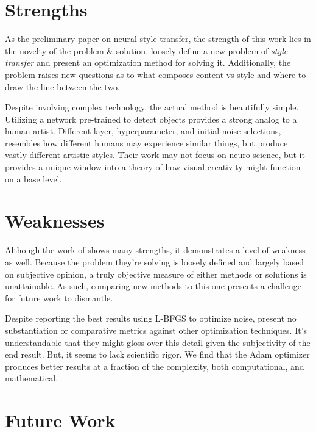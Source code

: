 \documentclass{article}
\begin{document}
\section{Strengths}

As the preliminary paper on neural style transfer, the strength of this work
lies in the novelty of the problem \& solution. \cite{2015arXiv150806576G}
loosely define a new problem of \textit{style transfer} and present an
optimization method for solving it.
Additionally, the problem raises new questions as to what
composes content vs style and where to draw the line between the two.

Despite involving complex technology, the actual method is beautifully simple.
Utilizing a network pre-trained to detect objects provides a strong analog to
a human artist. Different layer, hyperparameter, and initial noise selections,
resembles how different humans may experience similar things, but produce
vastly different artistic styles. Their work may not focus on neuro-science,
but it provides a unique window into a theory of how visual creativity might
function on a base level.



\section{Weaknesses}

Although the work of \cite{2015arXiv150806576G} shows many strengths, it
demonstrates a level of weakness as well. Because the problem they're solving
is loosely defined and largely based on subjective opinion, a truly objective
measure of either methods or solutions is unattainable. As such, comparing new
methods to this one presents a challenge for future work to dismantle.

Despite reporting the best results using L-BFGS to optimize noise,
\cite{2015arXiv150806576G} present no substantiation or comparative metrics
against other optimization techniques. It's understandable that they might
gloss over this detail given the subjectivity of the end result. But, it
seems to lack scientific rigor. We find that the Adam optimizer produces
better results at a fraction of the complexity, both computational, and
mathematical.



\section{Future Work}
\end{document}
